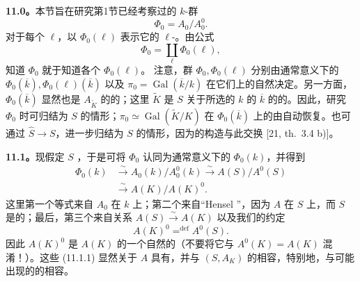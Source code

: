 \textbf{11.0。}本节旨在研究第1节已经考察过的 $k$-群
\begin{equation}\tag{11.0.1}
 \Phi_0=A_0/A_0^0.
\end{equation}
对于每个 $\ell$，以 $\Phi_0(\ell)$ 表示它的 $\ell$-。由公式
\begin{equation}\tag{11.0.2}
 \Phi_0=\coprod_\ell\Phi_0(\ell),
\end{equation}
知道 $\Phi_0$ 就于知道各个 $\Phi_0(\ell)$。
注意，群 $\Phi_0,\Phi_0(\ell)$ 分别由通常意义下的 $\Phi_0(\overline k),\Phi_0(\ell)(\overline k)$ 以及 $\pi_0=\operatorname{Gal}(\overline k/k)$ 在它们上的自然决定。另一方面，$\Phi_0(\overline k)$ 显然也是 $A_{\widetilde K}$ 的的；这里 $\widetilde K$ 是 $S$ 关于所选的 $k$ 的 $\overline k$ 的的。因此，研究 $\Phi_0$ 时可归结为 $S$ 的情形；$\pi_0\simeq\operatorname{Gal}(\widetilde K/K)$ 在 $\Phi_0(\overline k)$ 上的由自动恢复。也可通过 $\widehat S\longrightarrow S$，进一步归结为 $S$ 的情形，因为的构造与此交换 [21, th.~3.4 b)]。

\textbf{11.1。}现假定 $S$ ，于是可将 $\Phi_0$ 认同为通常意义下的 $\Phi_0(k)$，并得到
\begin{equation}\tag{11.1.1}
 \begin{aligned}
 \Phi_0(k)&\xrightarrow{\sim}A_0(k)/A_0^0(k)
 \xrightarrow{\sim}A(S)/A^0(S)\\
 &\xrightarrow{\sim}A(K)/A(K)^0.
 \end{aligned}
\end{equation}
这里第一个等式来自 $A_0$ 在 $k$ 上；第二个来自“Hensel ”，因为 $A$ 在 $S$ 上，而 $S$ 是的；最后，第三个来自关系 $A(S)\xrightarrow{\sim}A(K)$ 以及我们的约定
\begin{equation}\tag{11.1.2}
 A(K)^0\mathrel{\mathop=^{\mathrm{def}}}A^0(S).
\end{equation}
因此 $A(K)^0$ 是 $A(K)$ 的一个自然的（不要将它与 $A^0(K)=A(K)$ 混淆！）。这些
(11.1.1) 显然关于 $A$ 具有，并与 $(S,A_K)$ 的相容，特别地，与可能出现的的相容。

